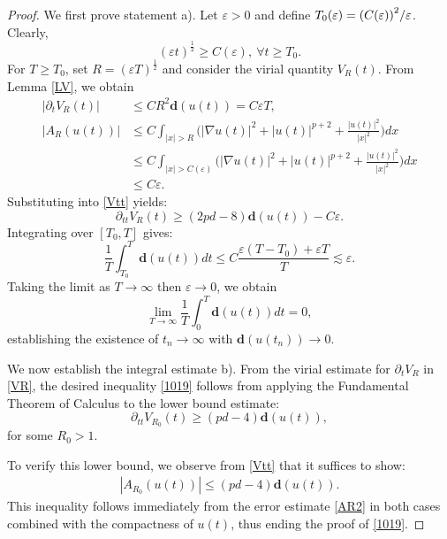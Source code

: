 \documentclass[12pt]{amsart}
\newcommand{\eps}{\varepsilon}
\begin{document}
\begin{proof}
We first prove statement a). Let $\varepsilon >0$ and define $T_{0}(\varepsilon )=({C(\varepsilon ))}^{2}/{%
\varepsilon }$. Clearly,
\begin{equation*}
(\varepsilon t)^{\frac{1}{2}}\geq C(\varepsilon ),\ \forall t\ge T_{0}.
\end{equation*}%
For $T\ge T_0$, set $R=\left( \varepsilon T\right) ^{\frac{1}{2}}$ and consider the virial quantity $V_R(t)$. From Lemma \ref{LV}, we obtain
\begin{align*}
|\partial _{t}V_{R}(t)|& \le C R^{2}\mathbf{d}(u(t)) =C\varepsilon T, \\
|A_{R}(u(t))|& \le C \int_{|x|>R}\bigl(|\nabla u(t)|^{2}+|u(t)|^{p+2}+%
\frac{|u(t)|^{2}}{|x|^{2}}\bigr)dx \\
& \le C\int_{|x|>C(\varepsilon )}\bigl(|\nabla u(t)|^{2}+|u(t)|^{p+2}+%
\frac{|u(t)|^{2}}{|x|^{2}}\bigr)dx \\
& \leq C \varepsilon.
\end{align*}
Substituting into \eqref{Vtt} yields:
\begin{equation*}
\partial _{tt}V_{R}(t)\geq (2pd-8)\mathbf{d}(u(t))-C\varepsilon.
\end{equation*}%
Integrating over $[T_{0},T]$ gives:
\begin{equation*}
\frac{1}{T}\int_{T_{0}}^{T}\mathbf{d}(u(t))dt\le C \frac{\varepsilon
(T-T_{0})+\varepsilon T}{T}\lesssim \varepsilon.
\end{equation*}%
Taking the limit as $T\to \infty$ then $\eps\to 0$, we obtain
\begin{equation*}
\lim_{T\rightarrow \infty }\frac{1}{T}\int_{0}^{T}\mathbf{d}(u(t))dt=0, 
\end{equation*}%
establishing the existence of $t_n\to \infty$ with $\mathbf{d}(u(t_n))\to 0$. 


We now establish the integral estimate b). From the virial estimate
 for $\partial_t V_R$ in \eqref{VR}, the desired inequality \eqref{1019} follows from applying the Fundamental Theorem of Calculus to the lower bound estimate: 
\begin{equation}
 \partial _{tt}V_{R_0}(t)\geq (pd-4)\mathbf{d}(u(t)),
\label{gap 3}
\end{equation}
for some $R_0>1$. 

To verify this lower bound, we observe from \eqref{Vtt} that it suffices to show:
\begin{align}\label{1010}
|A_{R_0}(u(t))|\leq
(pd-4)\mathbf{d}(u(t)).
\end{align}
This inequality follows immediately from the error estimate \eqref{AR2} in both cases combined with the compactness of $u(t)$, thus ending the proof of \eqref{1019}. 


\end{proof}
\end{document}

